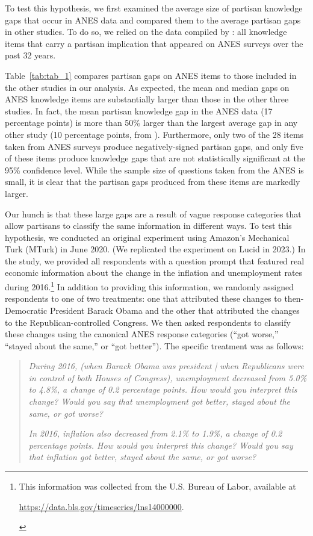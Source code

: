 \documentclass[12pt, letterpaper]{article}
\begin{document}
To test this hypothesis, we first examined the average size of partisan knowledge gaps that occur in ANES data and compared them to the average partisan gaps in other studies. To do so, we relied on the data compiled by \citet{roush_2021}: all knowledge items that carry a partisan implication that appeared on ANES surveys over the past 32 years.

Table~\ref{tab:tab_1} compares partisan gaps on ANES items to those included in the other studies in our analysis. As expected, the mean and median gaps on ANES knowledge items are substantially larger than those in the other three studies. In fact, the mean partisan knowledge gap in the ANES data (17 percentage points) is more than 50\% larger than the largest average gap in any other study (10 percentage points, from \citet{bullocketal_2015}). Furthermore, only two of the 28 items taken from ANES surveys produce negatively-signed partisan gaps, and only five of these items produce knowledge gaps that are not statistically significant at the 95\% confidence level. While the sample size of questions taken from the ANES is small, it is clear that the partisan gaps produced from these items are markedly larger.



Our hunch is that these large gaps are a result of vague response categories that allow partisans to classify the same information in different ways. To test this hypothesis, we conducted an original experiment using Amazon's Mechanical Turk (MTurk) in June 2020. (We replicated the experiment on Lucid in 2023.) In the study, we provided all respondents with a question prompt that featured real economic information about the change in the inflation and unemployment rates during 2016.\footnote{This information was collected from the U.S. Bureau of Labor, available at \begin{footnotesize} \url{https://data.bls.gov/timeseries/lns14000000}.\end{footnotesize}} In addition to providing this information, we randomly assigned respondents to one of two treatments: one that attributed these changes to then-Democratic President Barack Obama and the other that attributed the changes to the Republican-controlled Congress. We then asked respondents to classify these changes using the canonical ANES response categories (``got worse,'' ``stayed about the same,'' or ``got better''). The specific treatment was as follows: 

\begin{quotation} 
\noindent \textit{During 2016, (when Barack Obama was president | when Republicans were in control of both Houses of Congress), unemployment decreased from 5.0\% to 4.8\%, a change of 0.2 percentage points. How would you interpret this change? Would you say that unemployment got better, stayed about the same, or got worse?}

\bigskip

\noindent \textit{In 2016, inflation also decreased from 2.1\% to 1.9\%, a change of 0.2 percentage points. How would you interpret this change? Would you say that inflation got better, stayed about the same, or got worse?}

\end{quotation}
\end{document}

